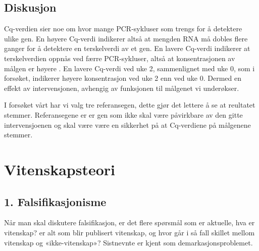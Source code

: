 \documentclass[
]{book}
\begin{document}
\hypertarget{diskusjon-1}{%
\section{Diskusjon}\label{diskusjon-1}}

Cq-verdien sier noe om hvor mange PCR-sykluser som trengs for å detektere ulike gen\citep{kuang2018}. En høyere Cq-verdi indikerer altså at mengden RNA må dobles flere ganger for å detektere en terskelverdi av et gen. En lavere Cq-verdi indikerer at terskelverdien oppnås ved færre PCR-sykluser, altså at konsentrasjonen av målgen er høyere \citep{Kung2018}. En lavere Cq-verdi ved uke 2, sammenlignet med uke 0, som i forsøket, indikerer høyere konsentrasjon ved uke 2 enn ved uke 0. Dermed en effekt av intervensjonen, avhengig av funksjonen til målgenet vi underøkser.

I forsøket vårt har vi valg tre referansegen, dette gjør det lettere å se at reultatet stemmer. Referansegene er er gen som ikke skal være påvirkbare av den gitte intervensjoenen og skal være være en sikkerhet på at Cq-verdiene på målgenene stemmer.

\hypertarget{vitenskapsteori}{%
\chapter{Vitenskapsteori}\label{vitenskapsteori}}

\hypertarget{falsifikasjonisme}{%
\section{1. Falsifikasjonisme}\label{falsifikasjonisme}}

Når man skal diskutere falsifikasjon, er det flere spørsmål som er aktuelle, hva er vitenskap? er alt som blir publisert vitenskap, og hvor går i så fall skillet mellom vitenskap og «ikke-vitenskap»? Sistnevnte er kjent som demarkasjonsproblemet.
\end{document}
